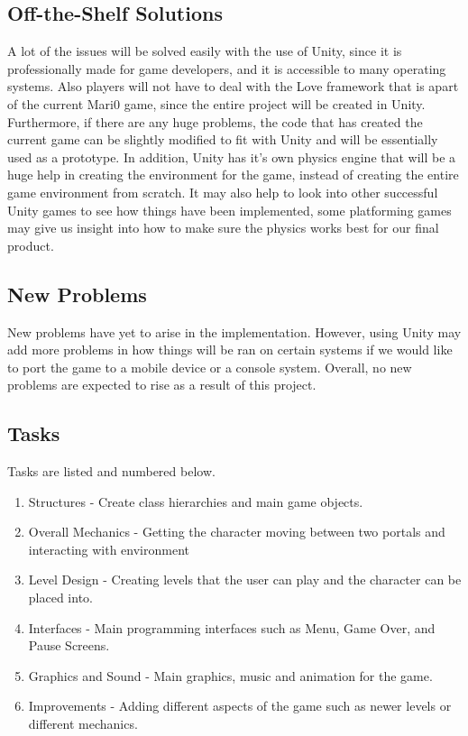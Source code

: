\documentclass[12pt, titlepage]{article}
\begin{document}
\subsection{Off-the-Shelf Solutions}
A lot of the issues will be solved easily with the use of Unity, since it is professionally made for game developers, and it is accessible to many operating systems. Also players will not have to deal with the Love framework that is apart of the current Mari0 game, since the entire project will be created in Unity.
Furthermore, if there are any huge problems, the code that has created the current game can be slightly modified to fit with Unity and will be essentially used as a prototype. In addition, Unity has it's own physics engine that will be a huge help in creating the environment for the game, instead of creating the entire game environment from scratch.
It may also help to look into other successful Unity games to see how things have been implemented, some platforming games may give us insight into how to make sure the physics works best for our final product. 

\subsection{New Problems}
New problems have yet to arise in the implementation. However, using Unity may add more problems in how things will be ran on certain systems if we would like to port the game to a mobile device or a console system. Overall, no new problems are expected to rise as a result of this project.

\subsection{Tasks}
Tasks are listed and numbered below.
\begin{enumerate}
\item Structures - Create class hierarchies and main game objects.
\item Overall Mechanics - Getting the character moving between two portals and interacting with environment
\item Level Design - Creating levels that the user can play and the character can be placed into.
\item Interfaces - Main programming interfaces such as Menu, Game Over, and Pause Screens.
\item Graphics and Sound - Main graphics, music and animation for the game.
\item Improvements - Adding different aspects of the game such as newer levels or different mechanics.
\end{enumerate}
\end{document}
